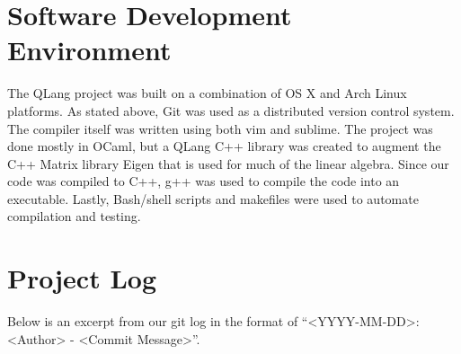\section{Software Development Environment}

The QLang project was built on a combination of OS X and Arch Linux platforms. As stated above, Git was used as a distributed version control system. The compiler itself was written using both vim and sublime. The project was done mostly in OCaml, but a QLang C++ library was created to augment the C++ Matrix library Eigen that is used for much of the linear algebra. Since our code was compiled to C++, g++ was used to compile the code into an executable. Lastly, Bash/shell scripts and makefiles were used to automate compilation and testing.

\section{Project Log}
Below is an excerpt from our git log in the format of “<YYYY-MM-DD>: <Author> - <Commit Message>”.

\begingroup
    \fontsize{9pt}{10pt}\selectfont
	 
\endgroup



